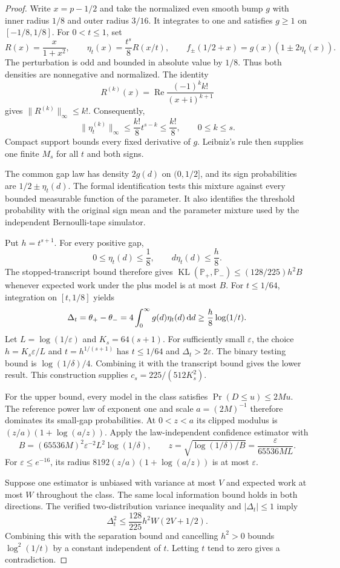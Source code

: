 \begin{proof}
Write $x=p-1/2$ and take the normalized even smooth bump $g$ with inner
radius $1/8$ and outer radius $3/16$. It integrates to one and satisfies
$g\ge1$ on $[-1/8,1/8]$. For $0<t\le1$, set
\[
 R(x)=\frac{x}{1+x^2},\qquad
 \eta_t(x)=\frac{t^s}{8}R(x/t),\qquad
 f_\pm(1/2+x)=g(x)(1\pm2\eta_t(x)).
\]
The perturbation is odd and bounded in absolute value by $1/8$.
Thus both densities are nonnegative and normalized.
The identity
\[
 R^{(k)}(x)=
 \operatorname{Re}\frac{(-1)^k k!}{(x+\mathrm i)^{k+1}}
\]
gives $\|R^{(k)}\|_\infty\le k!$. Consequently,
\[
 \|\eta_t^{(k)}\|_\infty
 \le \frac{k!}{8}t^{s-k}\le\frac{k!}{8},
 \qquad 0\le k\le s.
\]
Compact support bounds every fixed derivative of $g$.
Leibniz's rule then supplies one finite $M_s$ for all $t$ and both signs.

The common gap law has density $2g(d)$ on $(0,1/2]$, and its sign
probabilities are $1/2\pm\eta_t(d)$.
The formal identification tests this mixture against every bounded
measurable function of the parameter. It also identifies the threshold
probability with the original sign mean and the parameter mixture used
by the independent Bernoulli-tape simulator.

Put $h=t^{s+1}$. For every positive gap,
\[
 0\le\eta_t(d)\le\frac18,\qquad d\eta_t(d)\le\frac h8.
\]
The stopped-transcript bound therefore gives
$\operatorname{KL}(\mathbb P_+,\mathbb P_-)\le(128/225)h^2B$
whenever expected work under the plus model is at most $B$.
For $t\le1/64$, integration on $[t,1/8]$ yields
\[
 \Delta_t=\theta_+-\theta_-
 =4\int_0^\infty g(d)\eta_t(d)\,{\rm d}d
 \ge\frac h8\log(1/t).
\]
Let $L=\log(1/\varepsilon)$ and $K_s=64(s+1)$.
For sufficiently small $\varepsilon$, the choice
$h=K_s\varepsilon/L$ and $t=h^{1/(s+1)}$ has $t\le1/64$
and $\Delta_t>2\varepsilon$.
The binary testing bound is $\log(1/\delta)/4$.
Combining it with the transcript bound gives the lower result.
This construction supplies $c_s=225/(512K_s^2)$.

For the upper bound, every model in the class satisfies
$\Pr(D\le u)\le2Mu$.
The reference power law of exponent one and scale $a=(2M)^{-1}$
therefore dominates its small-gap probabilities.
At $0<z<a$ its clipped modulus is
$(z/a)(1+\log(a/z))$.
Apply the law-independent confidence estimator with
\[
 B=(65536M)^2\varepsilon^{-2}L^2\log(1/\delta),
 \qquad z=\sqrt{\log(1/\delta)/B}=\frac{\varepsilon}{65536ML}.
\]
For $\varepsilon\le e^{-16}$, its radius
$8192(z/a)(1+\log(a/z))$ is at most $\varepsilon$.

Suppose one estimator is unbiased with variance at most $V$
and expected work at most $W$ throughout the class.
The same local information bound holds in both directions.
The verified two-distribution variance inequality and $|\Delta_t|\le1$
imply
\[
 \Delta_t^2\le\frac{128}{225}h^2W(2V+1/2).
\]
Combining this with the separation bound and cancelling $h^2>0$
bounds $\log^2(1/t)$ by a constant independent of $t$.
Letting $t$ tend to zero gives a contradiction.
\end{proof}

